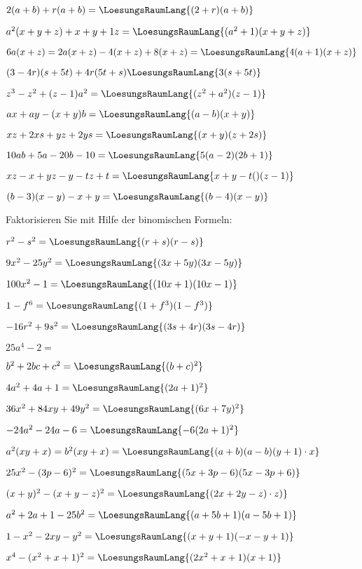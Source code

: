 \begin{bbwAufgabenBlock}
\item $2(a+b) + r(a+b) = \LoesungsRaumLang{(2+r)(a+b)}$
\item $a^2(x+y+z) + x+y+1z = \LoesungsRaumLang{(a^2+1)(x+y+z)}$
\item $6a(x+z) = 2a(x+z) -4(x+z) + 8(x+z)
= \LoesungsRaumLang{4(a+1)(x+z)}$
\item $(3-4r)(s+5t) + 4r(5t+s) \LoesungsRaumLang{3(s+5t)}$
\item $z^3-z^2 + (z-1)a^2 = \LoesungsRaumLang{(z^2+a^2)(z-1)}$
\item $ax+ay-(x+y)b = \LoesungsRaumLang{(a-b)(x+y)}$
\item $xz+2xs+yz+2ys = \LoesungsRaumLang{(x+y)(z+2s)}$
\item $10ab+5a - 20b -10 = \LoesungsRaumLang{5(a-2)(2b+1)}$
\item $xz-x+yz-y-tz+t = \LoesungsRaumLang{x+y-t()(z-1)}$
\item $(b-3)(x-y)-x+y = \LoesungsRaumLang{(b-4)(x-y)}$

\end{bbwAufgabenBlock}

\platzFuerBerechnungenBisEndeSeite{}



Faktorisieren Sie mit Hilfe der binomischen Formeln:


\begin{bbwAufgabenBlock}
\item $r^2-s^2 = \LoesungsRaumLang{(r+s)(r-s)}$
\item $9x^2 - 25y^2 = \LoesungsRaumLang{(3x+5y)(3x-5y)}$
\item $100x^2 -1 = \LoesungsRaumLang{(10x+1)(10x-1)}$
\item $1-f^6 = \LoesungsRaumLang{(1+f^3)(1-f^3)}$
\item $-16r^2 + 9s^2 = \LoesungsRaumLang{(3s+4r)(3s-4r)}$
\item $25a^4-2 = $ 
\item $b^2+2bc+c^2 = \LoesungsRaumLang{(b+c)^2}$
\item $4a^2+4a+1 = \LoesungsRaumLang{(2a+1)^2}$
\item $36x^2 + 84xy + 49y^2 = \LoesungsRaumLang{(6x+7y)^2}$
\item $-24a^2 - 24a -6 = \LoesungsRaumLang{-6(2a+1)^2}$
\item $a^2(xy+x) = b^2(xy+x)
= \LoesungsRaumLang{(a+b)(a-b)(y+1)\cdot{}x}$
\item $25x^2 - (3p-6)^2 = \LoesungsRaumLang{(5x+3p-6)(5x-3p+6)}$
\item $(x+y)^2 - (x+y-z)^2 = \LoesungsRaumLang{(2x+2y-z)\cdot{}z)}$
\item $a^2+2a+1-25b^2 = \LoesungsRaumLang{(a+5b+1)(a-5b+1)}$
\item $1-x^2-2xy-y^2 = \LoesungsRaumLang{(x+y+1)(-x-y+1)}$
\item $x^4 - (x^2+x+1)^2 = \LoesungsRaumLang{(2x^2+x+1)(x+1)}$
\end{bbwAufgabenBlock}

